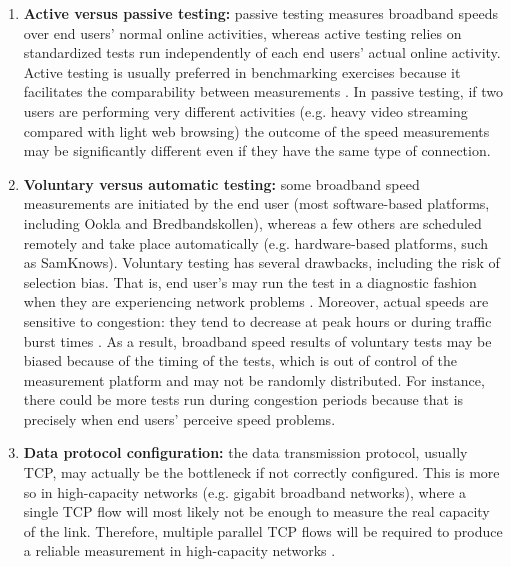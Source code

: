 \documentclass[12pt]{article}
\begin{document}
\begin{enumerate}[label=\textbf{\arabic* --}]
	\item \textbf{Active versus passive testing:} passive testing measures broadband speeds over end users' normal online activities, whereas active testing relies on standardized tests run independently of each end users' actual online activity. Active testing is usually preferred in benchmarking exercises because it facilitates the comparability between measurements \citep{zuhyle2015}. In passive testing, if two users are performing very different activities (e.g. heavy video streaming compared with light web browsing) the outcome of the speed measurements may be significantly different even if they have the same type of connection.

	\item \textbf{Voluntary versus automatic testing:} some broadband speed measurements are initiated by the end user (most software-based platforms, including Ookla and Bredbandskollen), whereas a few others are scheduled remotely and take place automatically (e.g. hardware-based platforms, such as SamKnows). Voluntary testing has several drawbacks, including the risk of selection bias. That is, end user's may run the test in a diagnostic fashion when they are experiencing network problems \citep{bauer2010}. Moreover, actual speeds are sensitive to congestion: they tend to decrease at peak hours or during traffic burst times \citep{sundaresan2012,zuhyle2015}. As a result, broadband speed results of voluntary tests may be biased because of the timing of the tests, which is out of control of the measurement platform and may not be randomly distributed. For instance, there could be more tests run during congestion periods because that is precisely when end users' perceive speed problems.          
	 
	\item \textbf{Data protocol configuration:} the data transmission protocol, usually TCP, may actually be the bottleneck if not correctly configured. This is more so in high-capacity networks (e.g. gigabit broadband networks), where a single TCP flow will most likely not be enough to measure the real capacity of the link. Therefore, multiple parallel TCP flows will be required to produce a reliable measurement in high-capacity networks \citep{bauer2010,bauer2016}.
	

\end{enumerate}
\end{document}
